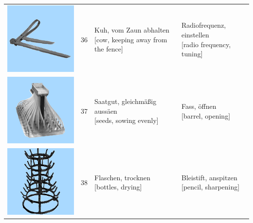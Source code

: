 \documentclass[
  english,
  man,floatsintext]{apa7}
\begin{document}
\begin{center}
\begin{ThreePartTable}
{\begin{longtable}{llll}
\includegraphics[valign=c, scale=0.23]{../materials/unfamiliar/36.png} & 36 & \makecell[l]{Kuh, vom Zaun abhalten\\{[cow, keeping away from the fence]}} & \makecell[l]{Radiofrequenz, einstellen\\{[radio frequency, tuning]}}\\
\includegraphics[valign=c, scale=0.23]{../materials/unfamiliar/37.png} & 37 & \makecell[l]{Saatgut, gleichmäßig aussäen\\{[seeds, sowing evenly]}} & \makecell[l]{Fass, öffnen\\{[barrel, opening]}}\\
\includegraphics[valign=c, scale=0.23]{../materials/unfamiliar/38.png} & 38 & \makecell[l]{Flaschen, trocknen\\{[bottles, drying]}} & \makecell[l]{Bleistift, anspitzen\\{[pencil, sharpening]}}\\

\end{longtable}}
\end{ThreePartTable}
\end{center}
\end{document}
